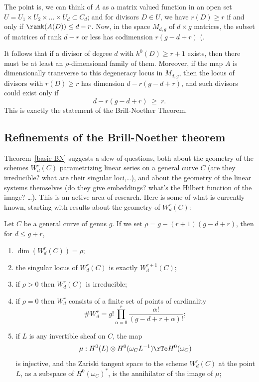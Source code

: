 The point is, we can think of $A$ as a matrix valued function in an open set $U = U_1 \times U_2 \times \dots \times U_d \subset C_d$; and for divisors $D \in U$, we have $r(D) \geq r$ if and only if $\rank(A(D)) \leq d-r$. Now, in the space $M_{d,g}$ of $d \times g$ matrices, the subset of matrices of rank $d-r$ or less has codimension $r(g-d+r)$ (\cite[Theorem ****]{Eisenbud1995}. 

It follows 
that if  a divisor of degree $d$ with $h^0(D) \geq r+1$ exists, then there must be at least an $\rho$-dimensional family of them. Moreover, if the map $A$ is dimensionally transverse to this degeneracy locus in $M_{d,g}$, then the locus of divisors with $r(D) \geq r$ has dimension $d - r(g-d+r)$, and such divisors could exist only if
$$
d - r(g-d+r) \; \geq \; r.
$$
This is exactly the statement of the Brill-Noether Theorem.


\subsection{Refinements of the Brill-Noether theorem}

Theorem~\ref{basic BN} suggests a slew of questions, both about the geometry of the schemes $W^r_d(C)$ parametrizing linear series on a general curve $C$ (are they irreducible? what are their singular loci,\dots), and about the geometry of the linear systems themselves (do they give embeddings? what's the Hilbert function of the image? \dots). This is an active area of research. Here is some of what is currently known, starting with results about the geometry of $W^r_d(C)$:

\begin{theorem}\label{Wrd omnibus}
Let $C$ be a general curve of genus $g$. If we set $\rho = g - (r+1)(g-d+r)$, then for $d \leq g+r$,
\begin{enumerate}
\item $\dim(W^r_d(C)) = \rho$;
\item\label{sing wrd} the singular locus of $W^r_d(C)$ is exactly $W^{r+1}_d(C)$;
\item\label{irr wrd} if $\rho > 0$ then $W^r_d(C)$ is irreducible;
\item\label{rho=0} if $\rho = 0$ then $W^r_d$ consists of a finite set of  points of cardinality
$$
\#W^r_d = g! \prod_{\alpha=0}^r \frac{\alpha!}{(g-d+r+\alpha)!};
$$
\item\label{Petri} if $L$ is any invertible sheaf on $C$, the map
$$
\mu : H^0(L) \otimes H^0(\omega_CL^{-1}) \rTo H^0(\omega_C)
$$
is injective, and the Zariski tangent space to the scheme $W^r_d(C)$ at the point $L$, as a subspace
of $H^0(\omega_C)^*$, is the annihilator of the image of $\mu$;
\end{enumerate}
\end{theorem}

